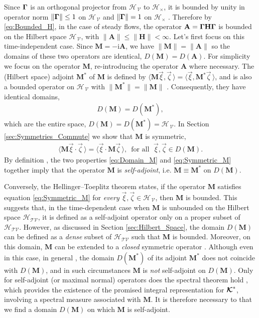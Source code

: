 \documentclass[11pt]{amsart}
\newcommand{\I}{\mathrm{i}}
\newcommand{\Mb}{\mathbf{M}}
\newcommand{\Hb}{\mathbf{H}}
\newcommand{\Ab}{\mathbf{A}}
\newcommand\Kbc{\mbox{\boldmath${\mathcal{K}}$}}
\newcommand{\Tc}{\mathcal{T}}
\newcommand{\Vc}{\mathcal{V}}
\newcommand{\Hs}{\mathscr{H}}
\newcommand\bGamma{\mbox{\boldmath${\Gamma}$}}
\begin{document}
Since $\bGamma$ is an orthogonal projector from $\Hs_{\,\Vc}$ to
$\Hs_\times$, it is bounded by unity in operator norm $\|\bGamma\|\leq1$ on
$\Hs_{\,\Vc}$ and $\|\bGamma\|=1$ on $\Hs_\times$
\cite{Reed-1980,Stone:64}. Therefore by \eqref{eq:Bounded_H}, in the
case of  steady flows, the operator $\Ab=\bGamma\Hb\bGamma$ is bounded
on the Hilbert space $\Hs_{\,\Vc}$, with $\|\Ab\|\leq\|\Hb\|<\infty$. Let's first
focus on this time-independent case. Since $\Mb=-\I\Ab$, we have 
$\|\Mb\|=\|\Ab\|$ so the domains of these two operators are identical,
$D(\Mb)=D(\Ab)$. For simplicity we focus on the operator $\Mb$,
re-introducing the operator $\Ab$ where necessary. The (Hilbert space)
adjoint $\Mb^*$ of $\Mb$ is defined by
$\langle\Mb\vec{\xi},\vec{\zeta}\,\rangle=\langle\vec{\xi},\Mb^*\vec{\zeta}\,\rangle$, and is also a
bounded operator on $\Hs_{\,\Vc}$ with $\|\Mb^*\|=\|\Mb\|$
\cite{Reed-1980}. Consequently, they have identical domains,       
%
\begin{align}\label{eq:Domain_M}
  D(\Mb)=D(\Mb^*),
\end{align}
%
which are the entire space, $D(\Mb)=D(\Mb^*)=\Hs_{\,\Vc}$. In
Section \ref{sec:Symmetries_Commute} we show that $\Mb$ is symmetric,
%
\begin{align}\label{eq:Symmetric_M}
  \langle\Mb\vec{\xi}\cdot\vec{\zeta}\,\rangle=\langle\vec{\xi}\cdot\Mb\vec{\zeta}\,\rangle,
  \, \text{ for all } \; \vec{\xi},\vec{\zeta}\in D(\Mb).
\end{align}
%
By definition \cite{Reed-1980,Stone:64}, the two properties
\eqref{eq:Domain_M} and \eqref{eq:Symmetric_M} together imply that the
operator $\Mb$ is \emph{self-adjoint}, i.e. $\Mb\equiv\Mb^*$ on $D(\Mb)$.





Conversely, the Hellinger--Toeplitz theorem \cite{Reed-1980} states,
if the operator $\Mb$ satisfies equation \eqref{eq:Symmetric_M} for
\emph{every} $\vec{\xi},\vec{\zeta}\in\Hs_{\,\Vc}$, then $\Mb$ is
bounded. This suggests that, in the time-dependent case when $\Mb$ is
unbounded on the Hilbert space $\Hs_{\Tc\Vc}$, it is defined as a
self-adjoint operator only on a proper subset of
$\Hs_{\Tc\Vc}$. However, as discussed in 
Section \ref{sec:Hilbert_Space}, the domain $D(\Mb)$ can be defined as
a \emph{dense} subset of $\Hs_{\Tc\Vc}$ such that $\Mb$ is
bounded. Moreover, on this domain, $\Mb$ can be extended to a 
\emph{closed} symmetric operator \cite{Reed-1980,Stone:64}. Although
even in this case, in general \cite{Reed-1980}, the domain $D(\Mb^*)$
of its adjoint $\Mb^*$ does not coincide with $D(\Mb)$, and in such
circumstances $\Mb$ is \emph{not} self-adjoint on $D(\Mb)$. Only for
self-adjoint (or maximal normal) operators does the spectral theorem hold
\cite{Reed-1980}, which provides the existence of the promised
integral representation for $\Kbc^*$, involving a spectral measure
associated with $\Mb$. It is therefore necessary to that we find a
domain $D(\Mb)$ on which $\Mb$ is self-adjoint.
\end{document}

